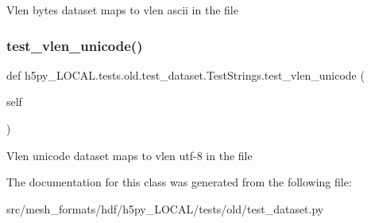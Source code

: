 \begin{DoxyVerb}Vlen bytes dataset maps to vlen ascii in the file \end{DoxyVerb}
 \mbox{\label{classh5py__LOCAL_1_1tests_1_1old_1_1test__dataset_1_1TestStrings_a42ac52e132091bd3d0d3b9286623ed8f}} 
\subsubsection{\texorpdfstring{test\+\_\+vlen\+\_\+unicode()}{test\_vlen\_unicode()}}
{\footnotesize\ttfamily def h5py\+\_\+\+L\+O\+C\+A\+L.\+tests.\+old.\+test\+\_\+dataset.\+Test\+Strings.\+test\+\_\+vlen\+\_\+unicode (\begin{DoxyParamCaption}\item[{}]{self }\end{DoxyParamCaption})}

\begin{DoxyVerb}Vlen unicode dataset maps to vlen utf-8 in the file \end{DoxyVerb}
 

The documentation for this class was generated from the following file\+:\begin{DoxyCompactItemize}
\item 
src/mesh\+\_\+formats/hdf/h5py\+\_\+\+L\+O\+C\+A\+L/tests/old/test\+\_\+dataset.\+py\end{DoxyCompactItemize}
